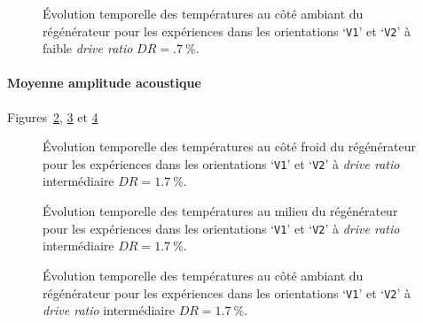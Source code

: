 \begin{figure}[!ht] %
    \centering
    
    \caption{\'Evolution temporelle des températures au côté ambiant du régénérateur pour les expériences dans les orientations `\texttt{V1}' et `\texttt{V2}' à faible \textit{drive ratio} $DR=\qty{.7}{\percent}$.}
    \label{fig:Acou_AHXin_V1V2_Low}
\end{figure}


\paragraph{Moyenne amplitude acoustique} Figures~\ref{fig:Acou_CHXin_V1V2_Mid}, \ref{fig:Acou_Regmid_V1V2_Mid} et \ref{fig:Acou_AHXin_V1V2_Mid}
\begin{figure}[!ht] %
    \centering
    
    \caption{\'Evolution temporelle des températures au côté froid du régénérateur pour les expériences dans les orientations `\texttt{V1}' et `\texttt{V2}' à \textit{drive ratio} intermédiaire $DR=\qty{1.7}{\percent}$.}
    \label{fig:Acou_CHXin_V1V2_Mid}
\end{figure}

\begin{figure}[!ht] %
    \centering
    
    \caption{\'Evolution temporelle des températures au milieu du régénérateur pour les expériences dans les orientations `\texttt{V1}' et `\texttt{V2}' à \textit{drive ratio} intermédiaire $DR=\qty{1.7}{\percent}$.}
    \label{fig:Acou_Regmid_V1V2_Mid}
\end{figure}

\begin{figure}[!ht] %
    \centering
    
    \caption{\'Evolution temporelle des températures au côté ambiant du régénérateur pour les expériences dans les orientations `\texttt{V1}' et `\texttt{V2}' à \textit{drive ratio} intermédiaire $DR=\qty{1.7}{\percent}$.}
    \label{fig:Acou_AHXin_V1V2_Mid}
\end{figure}

